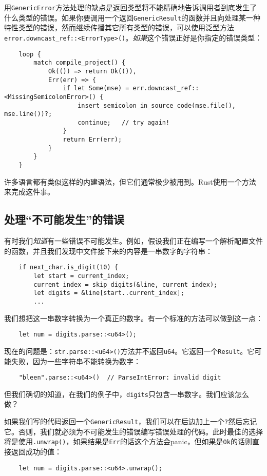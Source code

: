 用\texttt{GenericError}方法处理的缺点是返回类型将不能精确地告诉调用者到底发生了什么类型的错误。如果你要调用一个返回\texttt{GenericResult}的函数并且向处理某一种特性类型的错误，然而继续传播其它所有类型的错误，可以使用泛型方法\texttt{error.downcast\_ref::<ErrorType>()}。\emph{如果}这个错误正好是你指定的错误类型：
\begin{verbatim}
    loop {
        match compile_project() {
            Ok(()) => return Ok(()),
            Err(err) => {
                if let Some(mse) = err.downcast_ref::<MissingSemicolonError>() {
                    insert_semicolon_in_source_code(mse.file(), mse.line())?;
                    continue;   // try again!
                }
                return Err(err);
            }
        }
    }
\end{verbatim}

许多语言都有类似这样的内建语法，但它们通常极少被用到。Rust使用一个方法来完成这件事。

\subsection{处理“不可能发生”的错误}
有时我们\emph{知道}有一些错误不可能发生。例如，假设我们正在编写一个解析配置文件的函数，并且我们发现中文件接下来的内容是一串数字的字符串：
\begin{verbatim}
    if next_char.is_digit(10) {
        let start = current_index;
        current_index = skip_digits(&line, current_index);
        let digits = &line[start..current_index];
        ...
\end{verbatim}

我们想把这一串数字转换为一个真正的数字。有一个标准的方法可以做到这一点：
\begin{verbatim}
    let num = digits.parse::<u64>();
\end{verbatim}

现在的问题是：\texttt{str.parse::<u64>()}方法并不返回\texttt{u64}。它返回一个\texttt{Result}。它可能失败，因为一些字符串不能转换为数字：
\begin{verbatim}
    "bleen".parse::<u64>()  // ParseIntError: invalid digit
\end{verbatim}

但我们确切的知道，在我们的例子中，\texttt{digits}只包含一串数字。我们应该怎么做？

如果我们写的代码返回一个\texttt{GenericResult}，我们可以在后边加上一个\texttt{?}然后忘记它。否则，我们就必须为不可能发生的错误编写错误处理的代码。此时最佳的选择将是使用\texttt{.unwrap()}，如果结果是\texttt{Err}的话这个方法会panic，但如果是\texttt{Ok}的话则直接返回成功的值：
\begin{verbatim}
    let num = digits.parse::<u64>.unwrap();
\end{verbatim}

